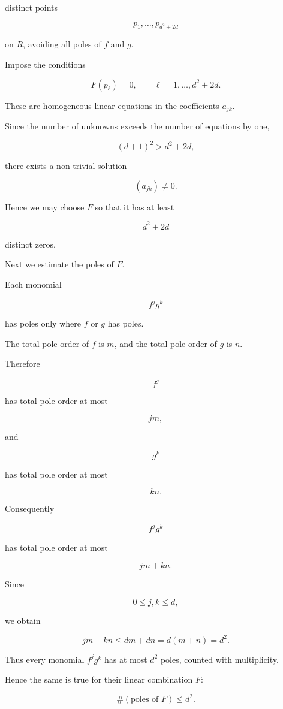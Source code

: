 \documentclass[12pt,a4paper]{article}
\theoremstyle{notespace}
\begin{document}
distinct points

\[
p_1,\dots,p_{d^2+2d}
\]

on \(R\), avoiding all poles of \(f\) and \(g\).

Impose the conditions

\[
F(p_\ell)=0,
\qquad
\ell=1,\dots,d^2+2d.
\]

These are homogeneous linear equations in the coefficients \(a_{jk}\).

Since the number of unknowns exceeds the number of equations by one,

\[
(d+1)^2
>
d^2+2d,
\]

there exists a non-trivial solution

\[
(a_{jk})\neq 0.
\]

Hence we may choose \(F\) so that it has at least

\[
d^2+2d
\]

distinct zeros.

\medskip

Next we estimate the poles of \(F\).

Each monomial

\[
f^j g^k
\]

has poles only where \(f\) or \(g\) has poles.

The total pole order of \(f\) is \(m\), and the total pole order of \(g\) is \(n\).

Therefore

\[
f^j
\]

has total pole order at most

\[
jm,
\]

and

\[
g^k
\]

has total pole order at most

\[
kn.
\]

Consequently

\[
f^j g^k
\]

has total pole order at most

\[
jm+kn.
\]

Since

\[
0\le j,k\le d,
\]

we obtain

\[
jm+kn
\le
dm+dn
=
d(m+n)
=
d^2.
\]

Thus every monomial \(f^jg^k\) has at most \(d^2\) poles, counted with multiplicity.

Hence the same is true for their linear combination \(F\):

\[
\#(\text{poles of }F)
\le d^2.
\]
\end{document}
